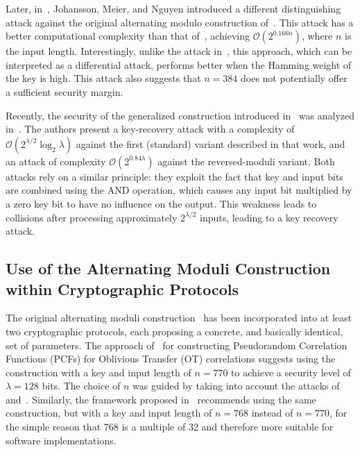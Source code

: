 \documentclass[journal=tosc,submission]{iacrtrans}
\theoremstyle{theorem}
\begin{document}
Later, in~\cite{JMN23}, Johansson, Meier, and Nguyen introduced a different distinguishing attack against the original alternating modulo construction of~\cite{TCC:BIPSW18}. This attack has a better computational complexity than that of~\cite{PKC:CCKK21}, achieving $\mathcal{O}(2^{0.166n})$, where $n$ is the input length. Interestingly, unlike the attack in~\cite{PKC:CCKK21}, this approach, which can be interpreted as a differential attack, performs better when the Hamming weight of the key is high. This attack also suggests that $n = 384$ does not potentially offer a sufficient security margin.

Recently, the security of the generalized construction introduced in~\cite{C:APRR24} was analyzed in~\cite{ToSC:AR25}. The authors present a key-recovery attack with a complexity of $\mathcal{O}(2^{\lambda/2} \log_2 \lambda)$ against the first (standard) variant described in that work, and an attack of complexity $\mathcal{O}(2^{0.84\lambda})$ against the reversed-moduli variant. Both attacks rely on a similar principle: they exploit the fact that key and input bits are combined using the AND operation, which causes any input bit multiplied by a zero key bit to have no influence on the output. This weakness leads to collisions after processing approximately $2^{\lambda/2}$ inputs, leading to a key recovery attack.



\subsection{Use of the Alternating Moduli Construction within Cryptographic Protocols}
\label{sec:bipsw_app}
The original alternating moduli construction~\cite{TCC:BIPSW18} has been incorporated into at least two cryptographic protocols, each proposing a concrete, and basically identical, set of parameters. The approach of~\cite{EC:BCMPR24} for constructing Pseudorandom Correlation Functions (PCFs) for Oblivious Transfer (OT) correlations suggests using the construction with a key and input length of $n = 770$ to achieve a security level of $\lambda = 128$ bits. The choice of $n$ was guided by taking into account the attacks of~\cite{PKC:CCKK21} and~\cite{JMN23}. Similarly, the framework proposed in~\cite{AC:CDDKS24} recommends using the same construction, but with a key and input length of $n = 768$ instead of $n = 770$, for the simple reason that 768 is a multiple of 32 and therefore more suitable for software implementations.
\end{document}
